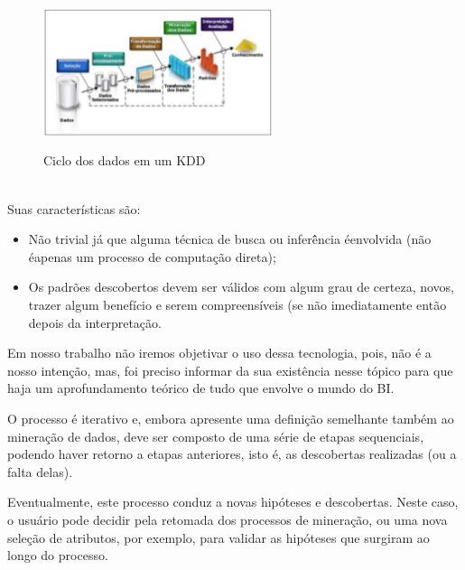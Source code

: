 \begin{figure}[H]
	\vspace*{0,2cm}
    \centering
    \caption{Ciclo dos dados em um KDD}
    \includegraphics[width=0.6\textwidth]{./04-figuras/figura-11}
    \label{fig:ilustfig11}
\end{figure}
\vspace*{-0,9cm}
{\raggedright {}} \\

Suas caracter\'{i}sticas s\~{a}o:

\begin{itemize}

    \item N\~{a}o trivial j\'{a} que alguma t\'{e}cnica de busca ou infer\^{ê}ncia \'{e}envolvida (n\~{a}o \'{e}apenas um processo de computa\c{c}\~{a}o direta);
    
    \item Os padr\~{o}es descobertos devem ser v\'{a}lidos com algum grau de certeza, novos, trazer algum benef\'{i}cio e serem compreens\'{i}veis (se n\~{a}o imediatamente ent\~{a}o depois da interpreta\c{c}\~{a}o.

\end{itemize}

Em nosso trabalho n\~{a}o iremos objetivar o uso dessa tecnologia, pois, n\~{a}o \'{e} a nosso inten\c{c}\~{a}o, mas, foi preciso informar da sua exist\^{e}ncia nesse t\'{o}pico para que haja um aprofundamento te\'{o}rico de tudo que envolve o mundo do BI. 

O processo \'{e} iterativo e, embora apresente uma defini\c{c}\~{a}o semelhante tamb\'{e}m ao minera\c{c}\~{a}o de dados, deve ser composto de uma s\'{e}rie de etapas sequenciais, podendo haver retorno a etapas anteriores, isto \'{e}, as descobertas realizadas (ou a falta delas).

Eventualmente, este processo conduz a novas hip\'{o}teses e descobertas. Neste caso, o usu\'{a}rio pode decidir pela retomada dos processos de minera\c{c}\~{a}o, ou uma nova sele\c{c}\~{a}o de atributos, por exemplo, para validar as hip\'{o}teses que surgiram ao longo do processo.

